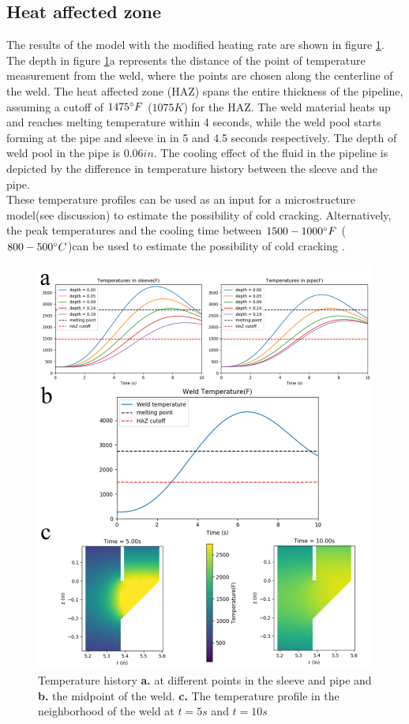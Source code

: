 \documentclass{article}
\makeatletter
\newcommand{\autocitel}[1]{\autocite{#1}\checknextarg}
\newcommand{\checknextarg}{\@ifnextchar\bgroup{\gobblenextarg}{}}
\newcommand{\gobblenextarg}[1]{$^,$\autocite{#1}\@ifnextchar\bgroup{\gobblenextarg}{}}
\makeatother
\begin{document}
\subsection{Heat affected zone}
	The results of the model with the modified heating rate are shown in figure \ref{fig3}. The depth in figure \ref{fig3}a represents the distance of the point of temperature measurement from the weld, where the points are chosen along the centerline of the weld. The heat affected zone (HAZ) spans the entire thickness of the pipeline, assuming a cutoff of $1475 \degree F$ ($1075 K$)\autocitel{cheng2004weld} for the HAZ. The weld material heats up and reaches melting temperature within 4 seconds, while the weld pool starts forming at the pipe  and sleeve in in 5 and 4.5 seconds respectively. The depth of weld pool in the pipe is $0.06 in$. The cooling effect of the fluid in the pipeline is depicted by the difference in temperature history between the sleeve and the pipe. \\ 
	These temperature profiles can be used as an input for a microstructure model(see discussion) to estimate the possibility of cold cracking. Alternatively, the peak temperatures and the cooling time between $1500-1000 \degree F$ ($800-500 \degree C$)can be used to estimate the possibility of cold cracking \autocitel{lobanov2013formation}. 

\begin{figure}[h]
	\centering
	\includegraphics[width=12 cm]{linear_results.png}
	\caption{ Temperature history \textbf{a.} at different points in the sleeve and pipe and \textbf{b.} the midpoint of the weld. \textbf{c.} The temperature profile in the neighborhood of the weld at $t = 5s$ and $t = 10s$ }
	\label{fig3}
\end{figure}
\end{document}
